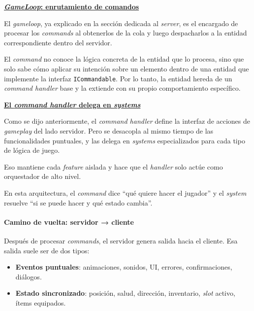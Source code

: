 \vspace{0.25cm}

\textbf{\underline{\textit{GameLoop}: enrutamiento de comandos}}

\vspace{0.15cm}

El \textit{gameloop}, ya explicado en la sección dedicada al \textit{server}, es el encargado de procesar los 
\textit{commands} al obtenerlos de la cola y luego despacharlos a la entidad correspondiente dentro 
del servidor.

\vspace{0.15cm}

El \textit{command} no conoce la lógica concreta de 
la entidad que lo procesa, sino que solo sabe cómo aplicar su intención sobre un elemento dentro de una entidad que 
implemente la interfaz \texttt{ICommandable}. Por lo tanto, la entidad hereda 
de un \textit{command handler} base y la extiende con su propio comportamiento específico.

\vspace{0.25cm}

\textbf{\underline{El \textit{command handler} delega en \textit{systems}}}

\vspace{0.15cm}

Como se dijo anteriormente, el \textit{command handler} define la interfaz de acciones de \textit{gameplay} del lado 
servidor. Pero se desacopla al mismo tiempo de las funcionalidades puntuales, y las delega en \textit{systems} 
especializados para cada tipo de lógica de juego.

Eso mantiene cada \textit{feature} aislada y hace que el \textit{handler} solo actúe como orquestador de alto nivel.

\vspace{0.25cm}

En esta arquitectura, el \textit{command} dice “qué quiere hacer el jugador” y el \textit{system} resuelve “si se 
puede hacer y qué estado cambia”.

\vspace{0.25cm}

\paragraph{Camino de vuelta: servidor → cliente}

Después de procesar \textit{commands}, el servidor genera salida hacia el cliente. Esa salida suele ser de dos tipos:
\begin{itemize}
    \item \textbf{Eventos puntuales}: animaciones, sonidos, UI, errores, confirmaciones, diálogos.
    \item \textbf{Estado sincronizado}: posición, salud, dirección, inventario, \textit{slot} activo, ítems equipados.
\end{itemize}

